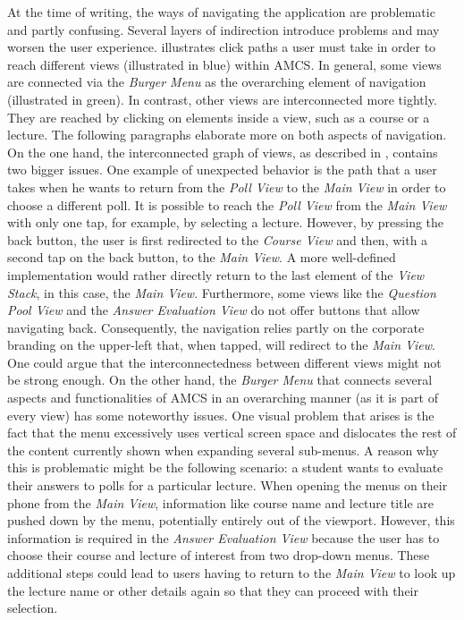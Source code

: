 At the time of writing, the ways of navigating the application are problematic and partly confusing. Several layers of indirection introduce problems and may worsen the user experience.
 illustrates click paths a user must take in order to reach different views (illustrated in blue) within AMCS. In general, some views are connected via the \emph{Burger Menu} as the overarching element of navigation (illustrated in green). In contrast, other views are interconnected more tightly. They are reached by clicking on elements inside a view, such as a course or a lecture. The following paragraphs elaborate more on both aspects of navigation.
\newline
\newline
On the one hand, the interconnected graph of views, as described in , contains two bigger issues. One example of unexpected behavior is the path that a user takes when he wants to return from the \emph{Poll View} to the \emph{Main View} in order to choose a different poll.
It is possible to reach the \emph{Poll View} from the \emph{Main View} with only one tap, for example, by selecting a lecture.
However, by pressing the back button, the user is first redirected to the \emph{Course View} and then, with a second tap on the back button, to the \emph{Main View}. A more well-defined implementation would rather directly return to the last element of the \emph{View Stack}, in this case, the \emph{Main View}.
\newline
\newline
Furthermore, some views like the \emph{Question Pool View} and the \emph{Answer Evaluation View} do not offer buttons that allow navigating back. Consequently, the navigation relies partly on the corporate branding on the upper-left that, when tapped, will redirect to the \emph{Main View}.
One could argue that the interconnectedness between different views might not be strong enough.
\newline
\newline
On the other hand, the \emph{Burger Menu} that connects several aspects and functionalities of AMCS in an overarching manner (as it is part of every view) has some noteworthy issues. 
One visual problem that arises is the fact that the menu excessively uses vertical screen space and dislocates the rest of the content currently shown when expanding several sub-menus. A reason why this is problematic might be the following scenario: a student wants to evaluate their answers to polls for a particular lecture. When opening the menus on their phone from the \emph{Main View}, information like course name and lecture title are pushed down by the menu, potentially entirely out of the viewport. However, this information is required in the \emph{Answer Evaluation View} because the user has to choose their course and lecture of interest from two drop-down menus. These additional steps could lead to users having to return to the \emph{Main View} to look up the lecture name or other details again so that they can proceed with their selection.
